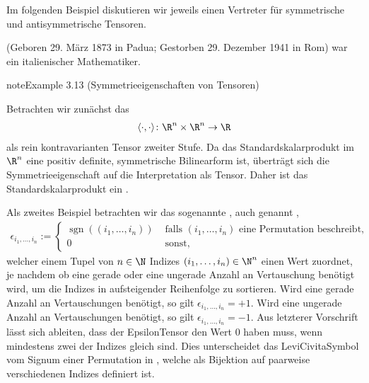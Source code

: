 \documentclass[letterpaper,10pt,english]{jupyterBook}
\begin{document}
\sphinxAtStartPar
Im folgenden Beispiel diskutieren wir jeweils einen Vertreter für symmetrische und antisymmetrische Tensoren.

\begin{sphinxShadowBox}

\sphinxAtStartPar
{} (Geboren 29. März 1873 in Padua; Gestorben 29. Dezember 1941 in Rom) war ein italienischer Mathematiker.
\end{sphinxShadowBox}
\label{vektoranalysis/tensor:example-29}
\begin{sphinxadmonition}{note}{Example 3.13 (Symmetrieeigenschaften von Tensoren)}



\sphinxAtStartPar
Betrachten wir zunächst das 
\begin{equation*}
\begin{split}\langle \cdot, \cdot \rangle \colon \R^n \times \R^n \rightarrow \R\end{split}
\end{equation*}
\sphinxAtStartPar
als rein kontravarianten Tensor zweiter Stufe.
Da das Standardskalarprodukt im \(\R^n\) eine positiv definite, symmetrische Bilinearform ist, überträgt sich die Symmetrieeigenschaft auf die Interpretation als Tensor.
Daher ist das Standardskalarprodukt ein .



\sphinxAtStartPar
Als zweites Beispiel betrachten wir das sogenannte , auch genannt ,
\begin{equation*}
\begin{split}\epsilon_{i_1,\ldots,i_n} :=
\begin{cases}
\operatorname{sgn}((i_1,\ldots,i_n))&\text{ falls }(i_1,\ldots,i_n)\text{ eine Permutation beschreibt,}\\
0&\text{ sonst,}
\end{cases}\end{split}
\end{equation*}
\sphinxAtStartPar
welcher einem Tupel von \(n\in\N\) Indizes \((i_1,\ldots,i_n) \in \N^n\) einen Wert zuordnet, je nachdem ob eine gerade oder eine ungerade Anzahl an Vertauschung benötigt wird, um die Indizes in aufsteigender Reihenfolge zu sortieren.
Wird eine gerade Anzahl an Vertauschungen benötigt, so gilt \(\epsilon_{i_1,\ldots,i_n} = +1\).
Wird eine ungerade Anzahl an Vertauschungen benötigt, so gilt \(\epsilon_{i_1,\ldots,i_n} = -1\).
Aus letzterer Vorschrift lässt sich ableiten, dass der Epsilon\sphinxhyphen{}Tensor den Wert \(0\) haben muss, wenn mindestens zwei der Indizes gleich sind.
Dies unterscheidet das Levi\sphinxhyphen{}Civita\sphinxhyphen{}Symbol vom Signum einer Permutation in {\hyperref[\detokenize{vektoranalysis/tensor:def:signumPermutation}]{}}, welche als Bijektion auf paarweise verschiedenen Indizes definiert ist.


\end{sphinxadmonition}
\end{document}
